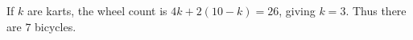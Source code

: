 If $k$ are karts, the wheel count is $4k+2(10-k)=26$, giving $k=3$. Thus there are $\boxed7$ bicycles.
